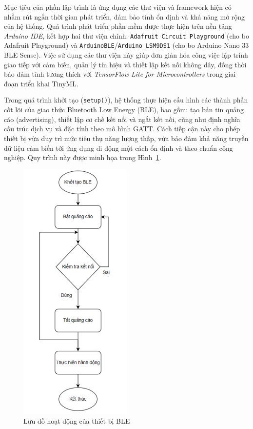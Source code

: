 Mục tiêu của phần lập trình là ứng dụng các thư viện và framework hiện có 
nhằm rút ngắn thời gian phát triển, đảm bảo tính ổn định và khả năng mở rộng 
của hệ thống. Quá trình phát triển phần mềm được thực hiện trên nền tảng 
\textit{Arduino IDE}, kết hợp hai thư viện chính: \texttt{Adafruit Circuit Playground} 
(cho bo Adafruit Playground) và \texttt{ArduinoBLE}/\texttt{Arduino\_LSM9DS1} 
(cho bo Arduino Nano 33 BLE Sense). Việc sử dụng các thư viện này giúp đơn giản hóa 
công việc lập trình giao tiếp với cảm biến, quản lý tín hiệu và thiết lập kết nối 
không dây, đồng thời bảo đảm tính tương thích với \textit{TensorFlow Lite for 
Microcontrollers} trong giai đoạn triển khai TinyML.  

Trong quá trình khởi tạo (\texttt{setup()}), hệ thống thực hiện cấu hình các 
thành phần cốt lõi của giao thức Bluetooth Low Energy (BLE), bao gồm: tạo 
bản tin quảng cáo (advertising), thiết lập cơ chế kết nối và ngắt kết nối, 
cũng như định nghĩa cấu trúc dịch vụ và đặc tính theo mô hình \gls{GATT}. 
Cách tiếp cận này cho phép thiết bị vừa duy trì mức tiêu thụ năng lượng thấp, 
vừa bảo đảm khả năng truyền dữ liệu cảm biến tới ứng dụng di động một cách 
ổn định và theo chuẩn công nghiệp. Quy trình này được minh họa trong 
Hình~\ref{flowBLE}.  
\begin{figure}[htbp]
    \centering
    \includegraphics[width=0.5\textwidth]{images/flowBLE.png}
    \caption{Lưu đồ hoạt động của thiết bị BLE}
    \label{flowBLE}
\end{figure}

